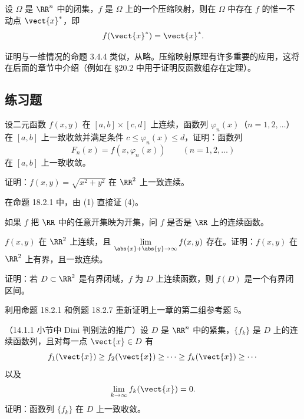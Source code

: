 \begin{xproposition}[18.2.5（压缩映射原理）]
设 $\Omega$ 是 $\RR^n$ 中的闭集，$f$ 是 $\Omega$ 上的一个压缩映射，则在 $\Omega$ 中存在 $f$ 的惟一不动点 $\vect{x}^{*}$，即
\[
  f(\vect{x}^{*})=\vect{x}^{*}.
\]
\end{xproposition}

证明与一维情况的命题 3.4.4 类似，从略。压缩映射原理有许多重要的应用，这将在后面的章节中介绍（例如在 §20.2 中用于证明反函数组存在定理）。

\subsection{练习题}

\begin{xexercise}[1]
设二元函数 $f(x,y)$ 在 $[a,b]\times[c,d]$ 上连续，函数列 $\varphi_n(x)$（$n=1,2,\ldots$）在 $[a,b]$ 上一致收敛并满足条件 $c\le\varphi_n(x)\le d$，证明：函数列
  \[
    F_n(x)=f(x,\varphi_n(x))\qquad(n=1,2,\ldots)
  \]
  在 $[a,b]$ 上一致收敛。
\end{xexercise}

\begin{xexercise}[2]
证明：$f(x,y)=\sqrt{x^2+y^2}$ 在 $\RR^2$ 上一致连续。
\end{xexercise}

\begin{xexercise}[3]
在命题 18.2.1 中，由 (1) 直接证 (4)。
\end{xexercise}

\begin{xexercise}[4]
如果 $f$ 把 $\RR$ 中的任意开集映为开集，问 $f$ 是否是 $\RR$ 上的连续函数。
\end{xexercise}

\begin{xexercise}[5]
$f(x,y)$ 在 $\RR^2$ 上连续，且 $\displaystyle\lim_{\abs{x}+\abs{y}\to\infty}f(x,y)$ 存在。证明：$f(x,y)$ 在 $\RR^2$ 上有界，且一致连续。
\end{xexercise}

\begin{xexercise}[6]
证明：若 $D\subset\RR^2$ 是有界闭域，$f$ 为 $D$ 上连续函数，则 $f(D)$ 是一个有界闭区间。
\end{xexercise}

\begin{xexercise}[7]
利用命题 18.2.1 和例题 18.2.7 重新证明上一章的第二组参考题 5。
\end{xexercise}

\begin{xexercise}[8]
（14.1.1 小节中 Dini 判别法的推广）设 $D$ 是 $\RR^n$ 中的紧集，$\{f_k\}$ 是 $D$ 上的连续函数列，且对每一点 $\vect{x}\in D$ 有
  \[
    f_1(\vect{x})\ge f_2(\vect{x})\ge\cdots\ge f_k(\vect{x})\ge\cdots
  \]
  以及
  \[
    \lim_{k\to\infty}f_k(\vect{x})=0.
  \]
  证明：函数列 $\{f_k\}$ 在 $D$ 上一致收敛。
\end{xexercise}

